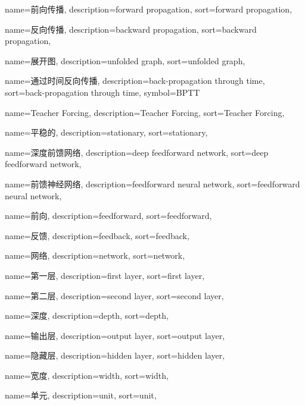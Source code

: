 {
  name=前向传播,
  description={forward propagation},
  sort={forward propagation},
}

{
  name=反向传播,
  description={backward propagation},
  sort={backward propagation},
}

{
  name=展开图,
  description={unfolded graph},
  sort={unfolded graph},
}

{
  name=通过时间反向传播,
  description={back-propagation through time},
  sort={back-propagation through time},
  symbol={BPTT}
}

{
  name=Teacher Forcing,
  description={Teacher Forcing},
  sort={Teacher Forcing},
}

{
  name=平稳的,
  description={stationary},
  sort={stationary},
}

{
  name=深度前馈网络,
  description={deep feedforward network},
  sort={deep feedforward network},
}

{
  name=前馈神经网络,
  description={feedforward neural network},
  sort={feedforward neural network},
}

{
  name=前向,
  description={feedforward},
  sort={feedforward},
}

{
  name=反馈,
  description={feedback},
  sort={feedback},
}

{
  name=网络,
  description={network},
  sort={network},
}

{
  name=第一层,
  description={first layer},
  sort={first layer},
}

{
  name=第二层,
  description={second layer},
  sort={second layer},
}

{
  name=深度,
  description={depth},
  sort={depth},
}

{
  name=输出层,
  description={output layer},
  sort={output layer},
}

{
  name=隐藏层,
  description={hidden layer},
  sort={hidden layer},
}

{
  name=宽度,
  description={width},
  sort={width},
}

{
  name=单元,
  description={unit},
  sort={unit},
}

